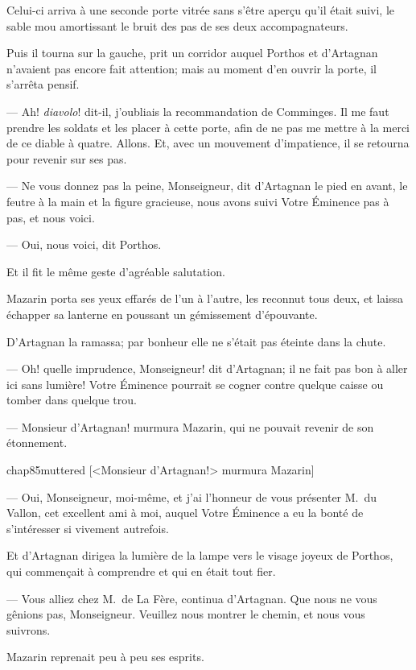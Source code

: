 Celui-ci arriva à une seconde porte vitrée sans s'être aperçu qu'il était suivi, le sable mou amortissant le bruit des pas de ses deux accompagnateurs.

Puis il tourna sur la gauche, prit un corridor auquel Porthos et d'Artagnan n'avaient pas encore fait attention; mais au moment d'en ouvrir la porte, il s'arrêta pensif.

— Ah! \textit{diavolo}! dit-il, j'oubliais la recommandation de Comminges. Il me faut prendre les soldats et les placer à cette
porte, afin de ne pas me mettre à la merci de ce diable à quatre. Allons.
Et, avec un mouvement d'impatience, il se retourna pour revenir sur ses pas.

— Ne vous donnez pas la peine, Monseigneur, dit d'Artagnan le pied en avant, le feutre à la main et la figure gracieuse, nous avons suivi Votre Éminence pas à pas, et nous voici.

— Oui, nous voici, dit Porthos.

Et il fit le même geste d'agréable salutation.

Mazarin porta ses yeux effarés de l'un à l'autre, les reconnut tous deux, et laissa échapper sa lanterne en poussant un gémissement d'épouvante.

D'Artagnan la ramassa; par bonheur elle ne s'était pas éteinte dans la chute.

— Oh! quelle imprudence, Monseigneur! dit d'Artagnan; il ne fait pas bon à aller ici sans lumière! Votre Éminence pourrait se cogner contre quelque caisse ou tomber dans quelque trou.

— Monsieur d'Artagnan! murmura Mazarin, qui ne pouvait revenir de son étonnement.

\begin{bwbigpic}
	[\basicscale] 
	{chap85muttered}
	[<Monsieur d'Artagnan!> murmura Mazarin]
\end{bwbigpic}

— Oui, Monseigneur, moi-même, et j'ai l'honneur de vous présenter M.~du Vallon, cet excellent ami à moi, auquel Votre Éminence a eu la bonté de s'intéresser si vivement autrefois.

Et d'Artagnan dirigea la lumière de la lampe vers le visage joyeux de Porthos, qui commençait à comprendre et qui en était tout fier.

— Vous alliez chez M.~de La Fère, continua d'Artagnan. Que nous ne vous gênions pas, Monseigneur. Veuillez nous montrer le chemin, et nous vous suivrons.

Mazarin reprenait peu à peu ses esprits.

